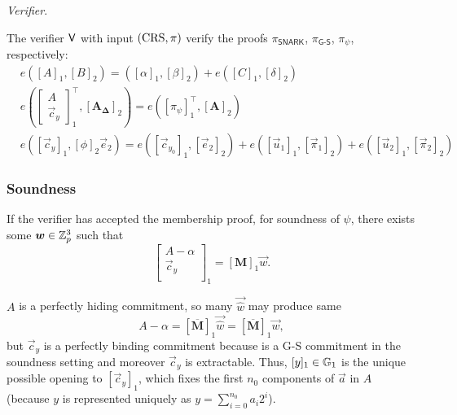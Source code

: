 \noindent \textit{Verifier}. 

The verifier $\mathsf{V}$ with input $(\textnormal{CRS},\pi)$ verify the proofs $\pi_{\textsf{SNARK}}$, $\pi_{\textsf{G-S}}$, $\pi_{\psi}$, respectively:
\[\begin{split}
&e\left(\left[A\right]_1,\left[B\right]_2\right)=\left([\alpha]_1,[\beta]_2\right)+e\left([C]_1,[\delta]_2\right)\\
&e\left(\left[\begin{array}{c}
A\\
\vec{c}_y
\end{array}\right]_1^{\top},\left[\mathbf{A}_{\mathbf{\Delta}}\right]_2\right)=e\left(\left[\pi_{\psi}\right]_1^{\top},\left[\mathbf{A}\right]_2\right)\\
&e([\vec{c}_y]_1,[\phi]_2\vec{e}_2)= e([\vec{c}_{y_0}]_1,[\vec{e}_2]_2)+e([\vec{u}_1]_1,[\vec{\pi}_1]_2)+e([\vec{u}_2]_1,[\vec{\pi}_2]_2)
\end{split}\]

\subsubsection*{Soundness}

If the verifier has accepted the membership proof, for soundness of $\psi$, there exists some $\vec{w} \in \Z_p^3$ such that
$$\left[\begin{array}{c}
A-\alpha\\
\vec{c}_y\\
\end{array}\right]_1 = \left[\mathbf{M}\right]_1 \vec{w}.$$

$A$ is a perfectly hiding commitment, so many $\vec{\hat{w}}$ may produce same 
$$A-\alpha=\left[\overline{\mathbf{M}}\right]_1\vec{\hat{w}}=\left[\overline{\mathbf{M}}\right]_1\vec{w},$$
 but $\vec{c}_y$ is a perfectly binding commitment because is a G-S commitment in the soundness setting and moreover $\vec{c}_y$ is extractable. Thus, $[y]_1 \in \mathbb{G}_1$ is the unique possible opening to $[\vec{c}_y]_1$, which fixes the first $n_0$ components of $\vec{a}$ in $A$ (because $y$ is represented uniquely as $y=\sum_{i=0}^{n_0} a_i 2^i$).

